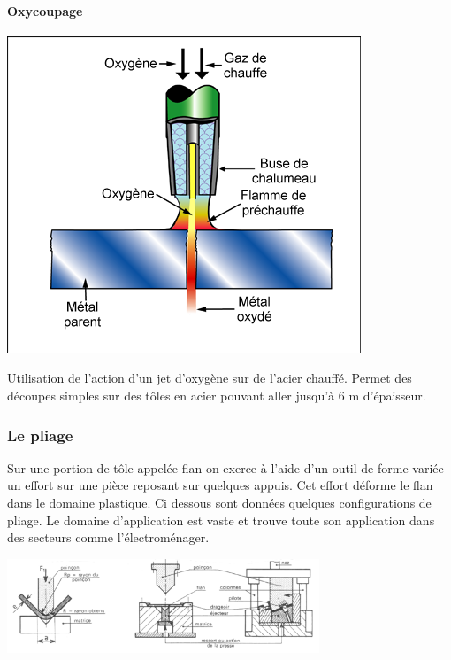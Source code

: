 \documentclass[11pt,oneside]{article}
\begin{document}
\paragraph*{Oxycoupage}
\begin{minipage}[c]{.25\linewidth}
\begin{center}
\includegraphics[width=.9\textwidth]{png/oxycoupage}
\end{center}
\end{minipage} \hfill
\begin{minipage}[c]{.6\linewidth}
Utilisation de l'action d'un jet d'oxygène sur de l'acier chauffé. Permet des découpes simples sur des tôles en acier pouvant aller jusqu'à 6 m d'épaisseur.
\end{minipage} 

\subsubsection{Le pliage}
Sur une portion de tôle appelée flan on exerce à l'aide d'un outil de forme variée un effort sur une pièce reposant sur quelques appuis. Cet effort déforme le flan dans le domaine plastique. Ci dessous sont données quelques configurations de pliage. Le domaine d'application est vaste et trouve toute son application dans des secteurs comme l'électroménager.

\begin{center}
\includegraphics[width=0.7\textwidth]{png/pliage}
\end{center}
\end{document}

